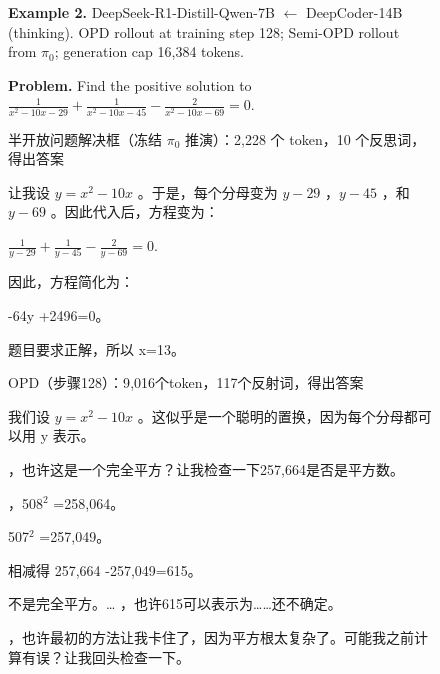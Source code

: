 \begin{figure}[p]
\centering
\begin{qualproblem}
\textbf{Example 2.} DeepSeek-R1-Distill-Qwen-7B $\leftarrow$ DeepCoder-14B (thinking). OPD rollout at training step 128; Semi-OPD rollout from $\pi_0$; generation cap 16{,}384 tokens.\par\smallskip
\textbf{Problem.} Find the positive solution to \newline $\frac 1{x^2-10x-29}+\frac1{x^2-10x-45}-\frac 2{x^2-10x-69}=0.$
\end{qualproblem}
\vspace{-1pt}
\begin{minipage}[t]{0.495\linewidth}\vspace{0pt}
\begin{Semi-OPDbox}{半开放问题解决框（冻结 $\pi_0$ 推演）：2{,}228 个 token，10 个反思词，得出答案}

让我设 $y = x^2 - 10x$ 。于是，每个分母变为 $y - 29$ ，$y - 45$ ，和 $y - 69$ 。因此代入后，方程变为：

$\frac{1}{y - 29} + \frac{1}{y - 45} - \frac{2}{y - 69} = 0.$ 


因此，方程简化为：

-64y +2496=0。


题目要求正解，所以 x=13。

\end{Semi-OPDbox}
\end{minipage}\hfill
\begin{minipage}[t]{0.495\linewidth}\vspace{0pt}
\begin{opdbox}{OPD（步骤128）：9{,}016个token，117个反射词，得出答案}

我们设 $y = x^2 - 10x$ 。这似乎是一个聪明的置换，因为每个分母都可以用 y 表示。


，也许这是一个完全平方？让我检查一下257,664是否是平方数。

，508$^2$ =258,064。

507$^2$ =257,049。

相减得 257,664 -257,049=615。

不是完全平方。\dots{} ，也许615可以表示为……还不确定。


，也许最初的方法让我卡住了，因为平方根太复杂了。可能我之前计算有误？让我回头检查一下。


\end{opdbox}
\end{minipage}
\end{figure}
